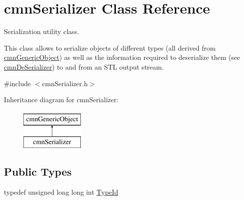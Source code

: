 \hypertarget{classcmn_serializer}{}\section{cmn\+Serializer Class Reference}
\label{classcmn_serializer}


Serialization utility class.

This class allows to serialize objects of different types (all derived from \hyperlink{classcmn_generic_object}{cmn\+Generic\+Object}) as well as the information required to deserialize them (see \hyperlink{classcmn_de_serializer}{cmn\+De\+Serializer}) to and from an S\+T\+L output stream.  




{\ttfamily \#include $<$cmn\+Serializer.\+h$>$}

Inheritance diagram for cmn\+Serializer\+:\begin{figure}[H]
\begin{center}
\leavevmode
\includegraphics[height=2.000000cm]{d3/dd7/classcmn_serializer}
\end{center}
\end{figure}
\subsection*{Public Types}
\begin{DoxyCompactItemize}
\item 
typedef unsigned long long int \hyperlink{classcmn_serializer_a386606b71d53552842929a1f9b42d45c}{Type\+Id}
\end{DoxyCompactItemize}
